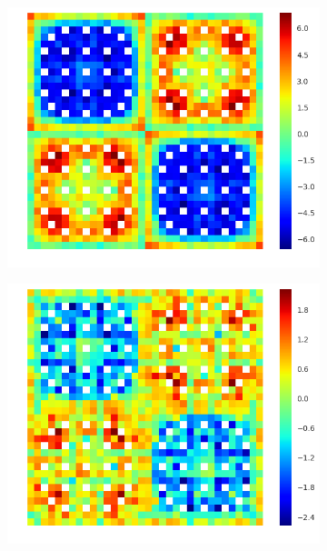 \begin{figure}[h!]
\centering
\begin{subfigure}{.33\textwidth}
  \centering
  \includegraphics[width=\linewidth]{figures/quantification/2x2/infinite-fiss-err-2}
  \caption{}
  \label{fig:chap8-2x2-inf-fiss-2}
\end{subfigure}%
\begin{subfigure}{.33\textwidth}
  \centering
  \includegraphics[width=\linewidth]{figures/quantification/2x2/infinite-fiss-err-8}
  \caption{}
  \label{fig:chap8-2x2-inf-fiss-8}

\end{subfigure}
\end{figure}
